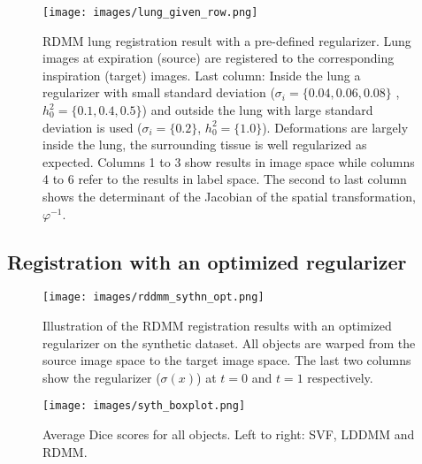 \documentclass{article}
\numberwithin{equation}{section}
\begin{document}
\begin{figure}[!ht]
  \begin{center}
    \texttt{[image: images/lung\_given\_row.png]}
  \end{center}
  \caption{RDMM lung registration result with a pre-defined regularizer. Lung images at expiration (source) are registered to the corresponding  inspiration (target) images. Last column: Inside the lung a regularizer with small standard deviation ($\sigma_i= \{0.04, 0.06, 0.08\}$ , $h_0^2=\{0.1, 0.4, 0.5\}$) and outside the lung with large standard deviation is used ($\sigma_i= \{0.2\}$, $h_0^2=\{1.0\}$). Deformations are largely inside the lung, the surrounding tissue is well regularized as expected. Columns 1 to 3 show results in image space while columns 4 to 6 refer to the results in label space. The second to last column shows the determinant of the Jacobian of the spatial transformation, $\varphi^{-1}$.\vspace{-0.5cm} }
  \label{fig:lung}
\end{figure}








\subsection{Registration with an optimized regularizer}
\label{subsec:rdmm_optimized_regularizer}

\begin{figure}[!h]
   \begin{minipage}{0.7\textwidth}
     \texttt{[image: images/rddmm\_sythn\_opt.png]}
    \caption{Illustration of the RDMM registration results with an optimized regularizer on the synthetic dataset. All objects are warped from the source image space to the target image space. The last two columns show the regularizer ($\sigma(x)$) at $t=0$ and $t=1$ respectively. }
    \label{fig:rdmm_opt_synth}
   \end{minipage}\hfill
   \begin{minipage}{0.25\textwidth}
   \vspace{-0.5em}
     \centering
     \texttt{[image: images/syth\_boxplot.png]}
     \caption{Average Dice scores for all objects. Left to right: SVF, LDDMM and RDMM.}\label{fig:syth_boxplot}
   \end{minipage}
\end{figure}
\end{document}

